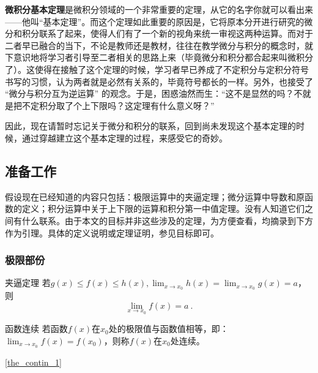 
\begin{issues}
\issueNeedCite
\issueDraft
\end{issues}

\textbf{微积分基本定理}是微积分领域的一个非常重要的定理，从它的名字你就可以看出来——他叫“基本定理”。而这个定理如此重要的原因是，它将原本分开进行研究的微分和积分联系了起来，使得人们有了一个新的视角来统一审视这两种运算。而对于二者早已融合的当下，不论是教师还是教材，往往在教学微分与积分的概念时，就下意识地将学习者引导至二者相关的思路上来（毕竟微分和积分都合起来叫微积分了）。这使得在接触了这个定理的时候，学习者早已养成了不定积分与定积分符号书写的习惯，认为两者就是必然有关系的，毕竟符号都长的一样。另外，也接受了 “微分与积分互为逆运算” 的观念。于是，困惑油然而生：“这不是显然的吗？不就是把不定积分取了个上下限吗？这定理有什么意义呀？”

因此，现在请暂时忘记关于微分和积分的联系，回到尚未发现这个基本定理的时候，通过穿越建立这个基本定理的过程，来感受它的奇妙。

\subsection{准备工作}

假设现在已经知道的内容只包括：极限运算中的夹逼定理；微分运算中导数和原函数的定义；积分运算中关于上下限的运算和积分第一中值定理。没有人知道它们之间有什么联系。由于本文的目标并非这些涉及的定理，为方便查看，均摘录到下方作为引理。具体的定义说明或定理证明，参见目标即可。

\subsubsection{极限部份}
\begin{lemma}{夹逼定理}\label{lem_FTcalc_3}
若$g(x)\leq f(x)\leq h(x),\lim _{x\to x_0}h(x)=\lim _{x\to x_0}g(x)=a$，则
$$\lim _{x\to x_0}f(x)=a~.$$
\end{lemma}

\begin{definition}{函数连续}\label{def_FTcalc_1}
若函数$f(x)$在$x_0$处的极限值与函数值相等，即：$\lim_{x\to x_0}f(x)=f(x_0)$，则称$f(x)$在$x_0$处连续。
\end{definition}
\autoref{the_contin_1}~
